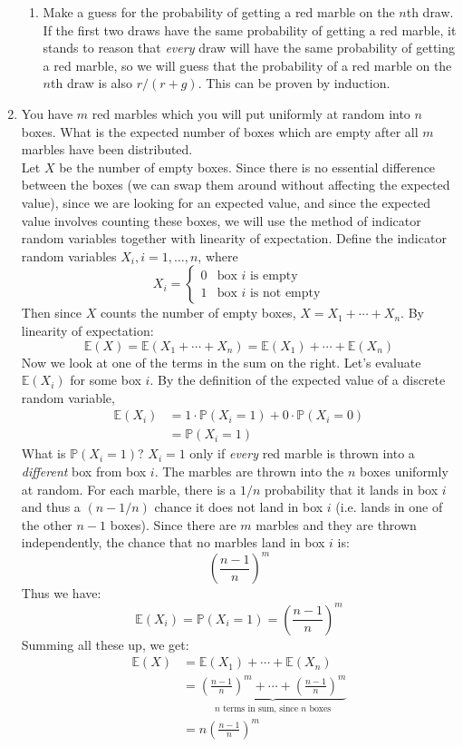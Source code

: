 \documentclass[12pt]{article}
\def\P{{\mathbb P}}
\def\E{{\mathbb E}}
\begin{document}
\begin{enumerate}
\begin{enumerate}
\item Make a guess for the probability of getting a red marble on the $n$th draw.\\

If the first two draws have the same probability of getting a red marble, it stands to reason that \emph{every} draw will have the same probability of getting a red marble, so we will guess that the probability of a red marble on the $n$th draw is also $r / (r + g)$. This can be proven by induction.
\end{enumerate}

\item You have $m$ red marbles which you will put uniformly at random into $n$ boxes. What is the expected number of boxes which are empty after all $m$ marbles have been distributed. \\

Let $X$ be the number of empty boxes. Since there is no essential difference between the boxes (we can swap them around without affecting the expected value), since we are looking for an expected value, and since the expected value involves counting these boxes, we will use the method of indicator random variables together with linearity of expectation. Define the indicator random variables $X_i, i = 1, \dots, n$, where
\[
X_i = \begin{cases}
0 & \text{box $i$ is empty}\\
1 & \text{box $i$ is not empty}
\end{cases}
\]
Then since $X$ counts the number of empty boxes, $X = X_1 + \cdots + X_n$. By linearity of expectation:
\[
\E(X) = \E(X_1 + \cdots + X_n) = \E(X_1) + \cdots + \E(X_n)
\]
Now we look at one of the terms in the sum on the right. Let's evaluate $\E(X_i)$ for some box $i$. By the definition of the expected value of a discrete random variable,
\begin{align*}
\E(X_i) &= 1 \cdot \P(X_i = 1) + 0 \cdot \P(X_i = 0) \\
&= \P(X_i = 1)
\end{align*}
What is $\P(X_i = 1)$? $X_i = 1$ only if \emph{every} red marble is thrown into a \emph{different} box from box $i$. The marbles are thrown into the $n$ boxes uniformly at random. For each marble, there is a $1/n$ probability that it lands in box $i$ and thus a $(n-1/n)$ chance it does not land in box $i$ (i.e. lands in one of the other $n-1$ boxes). Since there are $m$ marbles and they are thrown independently, the chance that no marbles land in box $i$ is:
\[
\left(\frac{n-1}{n}\right)^m
\]
Thus we have:
\[
\E(X_i) = \P(X_i = 1) = \left(\frac{n-1}{n}\right)^m
\]
Summing all these up, we get:
\begin{align*}
\E(X) &= \E(X_1) + \cdots + \E(X_n) \\
&= \underbrace{ \left(\frac{n-1}{n}\right)^m + \cdots + \left(\frac{n-1}{n}\right)^m }_{\text{$n$ terms in sum, since $n$ boxes}} \\
&= n \left(\frac{n-1}{n}\right)^m 
\end{align*}


\end{enumerate}
\end{document}
